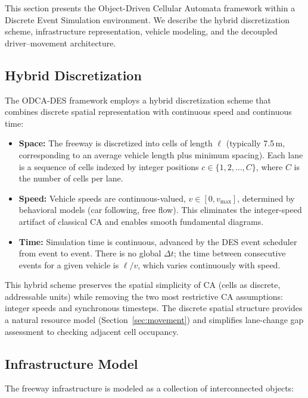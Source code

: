 \documentclass[review,number]{elsarticle}
\begin{document}
This section presents the Object-Driven Cellular Automata framework within a Discrete Event Simulation environment. We describe the hybrid discretization scheme, infrastructure representation, vehicle modeling, and the decoupled driver--movement architecture.

\subsection{Hybrid Discretization}
\label{sec:discretization}

The ODCA-DES framework employs a hybrid discretization scheme that combines discrete spatial representation with continuous speed and continuous time:

\begin{itemize}
    \item \textbf{Space:} The freeway is discretized into cells of length $\ell$ (typically 7.5\,m, corresponding to an average vehicle length plus minimum spacing). Each lane is a sequence of cells indexed by integer positions $c \in \{1, 2, \ldots, C\}$, where $C$ is the number of cells per lane.

    \item \textbf{Speed:} Vehicle speeds are continuous-valued, $v \in [0, v_{\max}]$, determined by behavioral models (car following, free flow). This eliminates the integer-speed artifact of classical CA and enables smooth fundamental diagrams.

    \item \textbf{Time:} Simulation time is continuous, advanced by the DES event scheduler from event to event. There is no global $\Delta t$; the time between consecutive events for a given vehicle is $\ell / v$, which varies continuously with speed.
\end{itemize}

This hybrid scheme preserves the spatial simplicity of CA (cells as discrete, addressable units) while removing the two most restrictive CA assumptions: integer speeds and synchronous timesteps. The discrete spatial structure provides a natural resource model (Section~\ref{sec:movement}) and simplifies lane-change gap assessment to checking adjacent cell occupancy.

\subsection{Infrastructure Model}
\label{sec:infrastructure}

The freeway infrastructure is modeled as a collection of interconnected objects:
\end{document}
